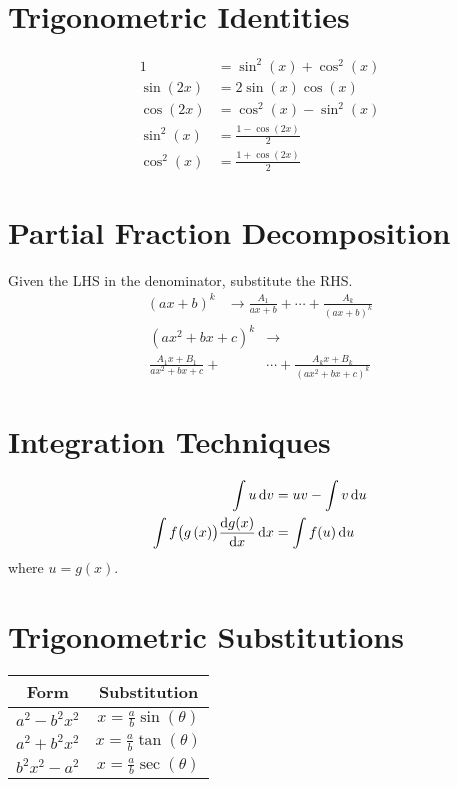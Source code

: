 \documentclass{article}
\begin{document}
\begin{multicols}{3}
    \section*{Trigonometric Identities}
    \begin{align*}
        1                        & = \sin^2{\left( x \right)} + \cos^2{\left( x \right)} \\
        \sin{\left( 2x \right)}  & = 2\sin{\left( x \right)}\cos{\left( x \right)}       \\
        \cos{\left( 2x \right)}  & = \cos^2{\left( x \right)} - \sin^2{\left( x \right)} \\
        \sin^2{\left( x \right)} & = \frac{1-\cos{\left( 2x \right)}}{2}                 \\
        \cos^2{\left( x \right)} & = \frac{1+\cos{\left( 2x \right)}}{2}
    \end{align*}
    \section*{Partial Fraction Decomposition}
    Given the LHS in the denominator, substitute the RHS\@.
    \begin{align*}
        \left(ax+b\right)^k & \to \frac{A_1}{ax+b} + \cdots + \frac{A_k}{\left( ax+b \right)^k}
    \end{align*}
    \begin{align*}
        \left(ax^2+bx+c\right)^k     & \to                                                   \\
        \frac{A_1x+B_1}{ax^2+bx+c} + & \cdots + \frac{A_k x+B_k}{\left( ax^2+bx+c \right)^k}
    \end{align*}
    \section*{Integration Techniques}
    \begin{align*}
        \int u \dd{v}                                          & = uv - \int v \dd{u} \\
        \int f\bigl(g\left( x \right)\bigr)\dv{g(x)}{x} \dd{x} & = \int f(u) \dd{u}
    \end{align*}
    where \(u = g(x)\).
    \section*{Trigonometric Substitutions}
    \begin{table}[H]
        \centering
        \begin{tabular}{c c}
            \toprule
            \textbf{Form}  & \textbf{Substitution}                        \\
            \midrule
            \(a^2-b^2x^2\) & \(x=\frac{a}{b}\sin{\left( \theta \right)}\) \\
            \(a^2+b^2x^2\) & \(x=\frac{a}{b}\tan{\left( \theta \right)}\) \\
            \(b^2x^2-a^2\) & \(x=\frac{a}{b}\sec{\left( \theta \right)}\) \\
            \bottomrule
        \end{tabular}
    \end{table}

\end{multicols}
\end{document}
